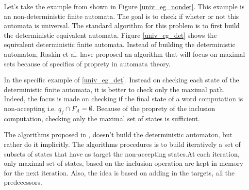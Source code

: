 \documentclass[letterpaper]{article}
\theoremstyle{definition}
\begin{document}
Let's take the example from \cite{AC_universality}
shown in Figure \ref{univ_eg_nondet}. This example is an
non-deterministic finite automata. The goal is to check
if wheter or not this automata is universal.
The standard algorithm for this problem is to first
build the deterministic equivalent automata.
Figure \ref{univ_eg_det} shows the equivalent deterministic finite
automata. Instead of building the deterministic automaton,
Raskin et al. \cite{AC_universality} have proposed an algorithm
that will focus on maximal sets because of specifics of proprety
in automata theory.

In the specific example of \ref{univ_eg_det}. Instead on checking
each state of the deterministic finite automata, it is
better to check only the maximal path. Indeed, the focus
is made on checking if the final state of a word computation is
non-accepting i.e. $q_f \cap F_A = \emptyset$. Because of the
proprety of the inclusion computation, checking only the
maximal set of states is sufficient.

The algorithms proposed in \cite{AC_universality}, doesn't build
the deterministic automaton, but rather do it implicitly.
The algorithms procedures is to build iteratively a set of subsets of states
that have as target the non-accepting states.At each iteration,
only maximal set of states, based on the inclusion operation are kept
in memory for the next iteration. Also, the idea is based on
adding in the targets, all the predecessors.
\end{document}
